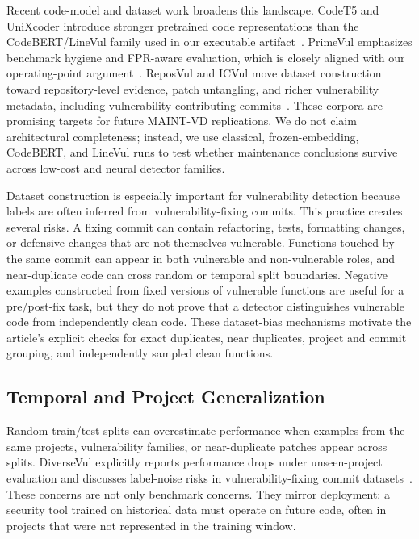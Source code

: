 \documentclass[a4paper,fleqn]{cas-dc}
\begin{document}
Recent code-model and dataset work broadens this landscape. CodeT5 and
UniXcoder introduce stronger pretrained code representations than the
CodeBERT/LineVul family used in our executable artifact~\cite{wang2021codet5,
guo2022unixcoder}. PrimeVul emphasizes benchmark hygiene and FPR-aware
evaluation, which is closely aligned with our operating-point
argument~\cite{ding2024primevul}. ReposVul and ICVul move dataset construction
toward repository-level evidence, patch untangling, and richer vulnerability
metadata, including vulnerability-contributing commits~\cite{li2024reposvul,
lu2025icvul}. These corpora are promising targets for future MAINT-VD
replications. We do not claim architectural completeness; instead, we use
classical, frozen-embedding, CodeBERT, and LineVul runs to test whether
maintenance conclusions survive across low-cost and neural detector families.

Dataset construction is especially important for vulnerability detection
because labels are often inferred from vulnerability-fixing commits. This
practice creates several risks. A fixing commit can contain refactoring,
tests, formatting changes, or defensive changes that are not themselves
vulnerable. Functions touched by the same commit can appear in both vulnerable
and non-vulnerable roles, and near-duplicate code can cross random or temporal
split boundaries. Negative examples constructed from fixed versions of
vulnerable functions are useful for a pre/post-fix task, but they do not prove
that a detector distinguishes vulnerable code from independently clean code.
These dataset-bias mechanisms motivate the article's explicit checks for exact
duplicates, near duplicates, project and commit grouping, and independently
sampled clean functions.

\subsection{Temporal and Project Generalization}

Random train/test splits can overestimate performance when examples from the
same projects, vulnerability families, or near-duplicate patches appear across
splits. DiverseVul explicitly reports performance drops under unseen-project
evaluation and discusses label-noise risks in vulnerability-fixing commit
datasets~\cite{chen2023diversevul}. These concerns are not only benchmark
concerns. They mirror deployment: a security tool trained on historical data
must operate on future code, often in projects that were not represented in the
training window.
\end{document}
